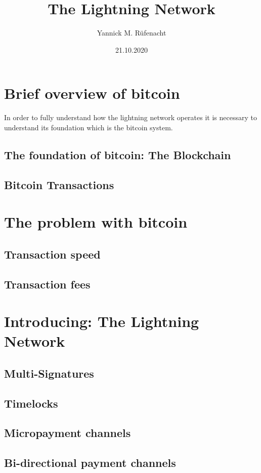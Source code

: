\documentclass[a4paper, 12pt]{report}
\begin{document}
\title{\Large{\textbf{The Lightning Network}}}
\author{Yannick M. Rüfenacht}
\date{21.10.2020}
\maketitle

\tableofcontents

\chapter{Brief overview of bitcoin}
In order to fully understand how the lightning network operates it is necessary to understand its foundation which is the bitcoin system.
\section{The foundation of bitcoin: The Blockchain}
\section{Bitcoin Transactions}

\chapter{The problem with bitcoin}
\section{Transaction speed}
\section{Transaction fees}

\chapter{Introducing: The Lightning Network}
\section{Multi-Signatures}
\section{Timelocks}
\section{Micropayment channels}
\section{Bi-directional payment channels}
\end{document}
